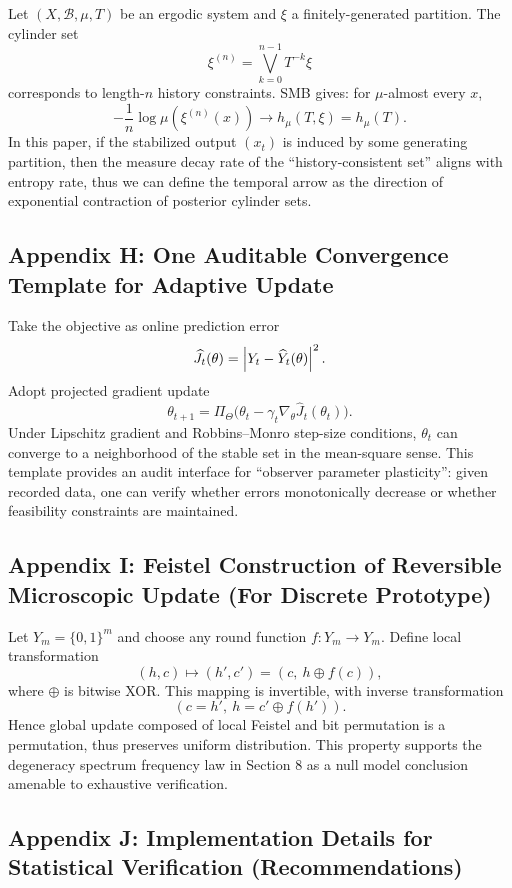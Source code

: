 Let $(X,\mathcal{B},\mu,T)$ be an ergodic system and $\xi$ a finitely-generated partition. The cylinder set
\[
\xi^{(n)}=\bigvee_{k=0}^{n-1}T^{-k}\xi
\]
corresponds to length-$n$ history constraints. SMB gives: for $\mu$-almost every $x$,
\[
-\frac1n\log\mu(\xi^{(n)}(x))\to h_{\mu}(T,\xi)=h_{\mu}(T).
\]
In this paper, if the stabilized output $(x_t)$ is induced by some generating partition, then the measure decay rate of the ``history-consistent set'' aligns with entropy rate, thus we can define the temporal arrow as the direction of exponential contraction of posterior cylinder sets.

\subsection{Appendix H: One Auditable Convergence Template for Adaptive Update}
\label{app:adaptive}

Take the objective as online prediction error
\[
\widehat J_t(\theta)=\left\lvert Y_t-\widehat Y_t(\theta)\right\rvert^2.
\]
Adopt projected gradient update
\[
\theta_{t+1}=\Pi_{\Theta}\big(\theta_t-\gamma_t\nabla_{\theta}\widehat J_t(\theta_t)\big).
\]
Under Lipschitz gradient and Robbins--Monro step-size conditions, $\theta_t$ can converge to a neighborhood of the stable set in the mean-square sense. This template provides an audit interface for ``observer parameter plasticity'': given recorded data, one can verify whether errors monotonically decrease or whether feasibility constraints are maintained.

\subsection{Appendix I: Feistel Construction of Reversible Microscopic Update (For Discrete Prototype)}
\label{app:feistel}

Let $Y_m=\{0,1\}^m$ and choose any round function $f:Y_m\to Y_m$. Define local transformation
\[
(h,c)\mapsto(h',c')=(c,\ h\oplus f(c)),
\]
where $\oplus$ is bitwise XOR. This mapping is invertible, with inverse transformation
\[
(c=h',\ h=c'\oplus f(h')).
\]
Hence global update composed of local Feistel and bit permutation is a permutation, thus preserves uniform distribution. This property supports the degeneracy spectrum frequency law in Section 8 as a null model conclusion amenable to exhaustive verification.

\subsection{Appendix J: Implementation Details for Statistical Verification (Recommendations)}
\label{app:tests}

